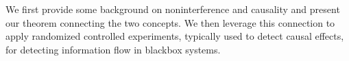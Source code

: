 \documentclass[10pt, onecolumn]{report}
\begin{document}
We first provide some background on noninterference and causality
and present our theorem connecting the two concepts. We then leverage this connection
to apply randomized controlled experiments, typically used
to detect causal effects, for detecting information flow in blackbox systems. 
%
%
%
\end{document}
